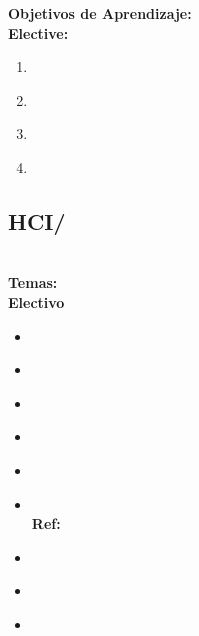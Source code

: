\noindent \textbf{Objetivos de Aprendizaje:}\\
\noindent \textbf{Elective:}
\begin{enumerate}
	\setcounter{enumi}{0}
	\item \HCIStatisticalmethodsforHCILOExplainBasicAnd\xspace[\HCIStatisticalmethodsforHCILOExplainBasicAndLevel]\label{sec:BOK:HCIStatisticalmethodsforHCILOExplainBasicAnd}
	\item \HCIStatisticalmethodsforHCILOExtractAnd\xspace[\HCIStatisticalmethodsforHCILOExtractAndLevel]\label{sec:BOK:HCIStatisticalmethodsforHCILOExtractAnd}
	\item \HCIStatisticalmethodsforHCILODesignAThat\xspace[\HCIStatisticalmethodsforHCILODesignAThatLevel]\label{sec:BOK:HCIStatisticalmethodsforHCILODesignAThat}
	\item \HCIStatisticalmethodsforHCILOConductAnd\xspace[\HCIStatisticalmethodsforHCILOConductAndLevel]\label{sec:BOK:HCIStatisticalmethodsforHCILOConductAnd}
\end{enumerate}


\subsection{HCI/\HCIHumanfactorsandsecurity}\label{sec:BOK:HCIHumanfactorsandsecurity}
\HCIHumanfactorsandsecurityDescription\\
\noindent \textbf{Temas:}\\
\noindent \textbf{Electivo}
\begin{itemize}
	\item \HCIHumanfactorsandsecurityTopicApplied\label{sec:BOK:HCIHumanfactorsandsecurityTopicApplied}
	\item \HCIHumanfactorsandsecurityTopicSecurity\label{sec:BOK:HCIHumanfactorsandsecurityTopicSecurity}
	\item \HCIHumanfactorsandsecurityTopicRegulatory\label{sec:BOK:HCIHumanfactorsandsecurityTopicRegulatory}
	\item \HCIHumanfactorsandsecurityTopicOrganizational\label{sec:BOK:HCIHumanfactorsandsecurityTopicOrganizational}
	\item \HCIHumanfactorsandsecurityTopicUsability\label{sec:BOK:HCIHumanfactorsandsecurityTopicUsability}
	\item \HCIHumanfactorsandsecurityTopicPretext\xspace \\ \textbf{Ref:} \label{sec:BOK:HCIHumanfactorsandsecurityTopicPretext}
	\item \HCIHumanfactorsandsecurityTopicTrust\label{sec:BOK:HCIHumanfactorsandsecurityTopicTrust}
	\item \HCIHumanfactorsandsecurityTopicBiometric\label{sec:BOK:HCIHumanfactorsandsecurityTopicBiometric}
	\item \HCIHumanfactorsandsecurityTopicIdentity\label{sec:BOK:HCIHumanfactorsandsecurityTopicIdentity}
\end{itemize}


